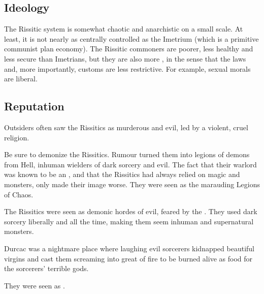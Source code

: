 \subsection{Ideology}
The Rissitic system is somewhat chaotic and anarchistic on a small scale. 
At least, it is not nearly as centrally controlled as the Imetrium (which is a primitive communist plan economy). 
The Rissitic commoners are poorer, less healthy and less secure than Imetrians, but they are also more , in the sense that the laws and, more importantly, customs are less restrictive. 
For example, sexual morals are liberal. 





\subsection{Reputation}
Outsiders often saw the Rissitics as murderous and evil, led by a violent, cruel religion. 


Be sure to demonize the Rissitics. 
Rumour turned them into legions of demons from Hell, inhuman wielders of dark sorcery and evil.
The fact that their warlord \Narkiza was known to be an \Ashenoch, and that the Rissitics had always relied on magic and monsters, only made their image worse.
They were seen as the marauding Legions of Chaos.

The Rissitics were seen as demonic hordes of evil, feared by the \Velcadians.
They used dark sorcery liberally and all the time, making them seem inhuman and supernatural monsters.

Durcac was a nightmare place where laughing evil sorcerers kidnapped beautiful virgins and cast them screaming into great  of fire to be burned alive as food for the sorcerers' terrible gods. 

They were seen as .






